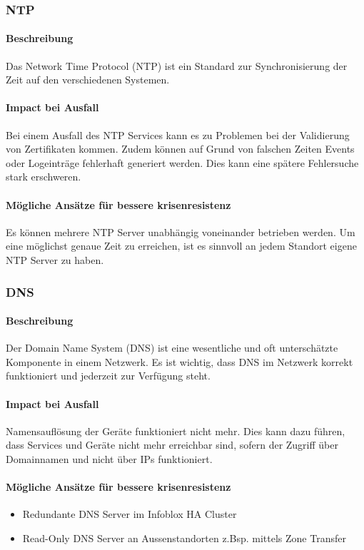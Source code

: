 \subsubsection{NTP}
\paragraph{Beschreibung}
Das Network Time Protocol (NTP) ist ein Standard zur Synchronisierung der Zeit auf den verschiedenen Systemen.

\paragraph{Impact bei Ausfall}
Bei einem Ausfall des NTP Services kann es zu Problemen bei der Validierung von Zertifikaten kommen. Zudem können auf Grund von falschen Zeiten Events oder Logeinträge fehlerhaft generiert werden. Dies kann eine spätere Fehlersuche stark erschweren.

\paragraph{Mögliche Ansätze für bessere krisenresistenz}
Es können mehrere NTP Server unabhängig voneinander betrieben werden. Um eine möglichst genaue Zeit zu erreichen, ist es sinnvoll an jedem Standort eigene NTP Server zu haben.

\subsubsection{DNS}
\paragraph{Beschreibung}
Der Domain Name System (DNS) ist eine wesentliche und oft unterschätzte Komponente in einem Netzwerk. Es ist wichtig, dass DNS im Netzwerk korrekt funktioniert und jederzeit zur Verfügung steht.

\paragraph{Impact bei Ausfall}
Namensauflösung der Geräte funktioniert nicht mehr. Dies kann dazu führen, dass Services und Geräte nicht mehr erreichbar sind, sofern der Zugriff über Domainnamen und nicht über IPs funktioniert.

\paragraph{Mögliche Ansätze für bessere krisenresistenz}
\begin{itemize}
	\item Redundante DNS Server im Infoblox HA Cluster
	\item Read-Only DNS Server an Aussenstandorten z.Bsp. mittels Zone Transfer
\end{itemize}

